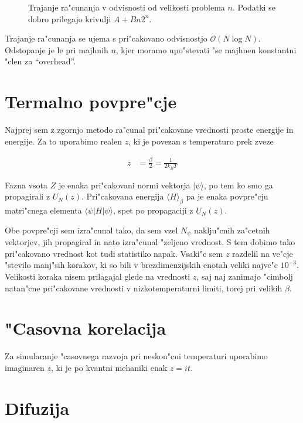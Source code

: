 \documentclass[a4paper,10pt]{article}
\begin{document}
\begin{figure}[h]
\centering

 \caption{Trajanje ra"cunanja v odvisnosti od velikosti problema $n$. Podatki se dobro prilegajo krivulji $A + B n 2^n$. }
\end{figure}

Trajanje ra"cunanja se ujema s pri"cakovano odvisnostjo $\mathcal{O}(N \log N)$. 
Odstopanje je le pri majhnih $n$, kjer moramo upo"stevati "se majhnen konstantni "clen za ``overhead''.

\section{Termalno povpre"cje}

Najprej sem z zgornjo metodo ra"cunal pri"cakovane vrednosti proste energije in energije. 
Za to uporabimo realen $z$, ki je povezan s temperaturo prek zveze

\begin{align}
 z &= \frac{\beta}{2} = \frac{1}{2k_B T}
\end{align}

Fazna vsota $Z$ je enaka pri"cakovani normi vektorja $|\psi\rangle$, po tem ko smo ga propagirali z $U_N(z)$. Pri"cakovana energija $\langle H \rangle_\beta$ pa je enaka povpre"cju matri"cnega elementa $\langle \psi | H | \psi\rangle$, spet po propagaciji z $U_N(z)$. 

Obe povpre"cji sem izra"cunal tako, da sem vzel $N_\psi$ naklju"cnih za"cetnih vektorjev, jih propagiral in nato izra"cunal "zeljeno vrednost. 
S tem dobimo tako pri"cakovano vrednost kot tudi statistiko napak. 
Vsaki"c sem $z$ razdelil na ve"cje "stevilo manj"sih korakov, ki so bili v brezdimenzijskih enotah veliki najve"c $10^{-3}$. 
Velikosti koraka nisem prilagajal glede na vrednosti $z$, saj naj zanimajo "cimbolj natan"cne pri"cakovane vrednosti v nizkotemperaturni limiti, torej pri velikih $\beta$. 

\section{"Casovna korelacija}

Za simularanje "casovnega razvoja pri neskon"cni temperaturi uporabimo imaginaren $z$, ki je po kvantni mehaniki enak $z = it$. 


\section{Difuzija}
\end{document}

